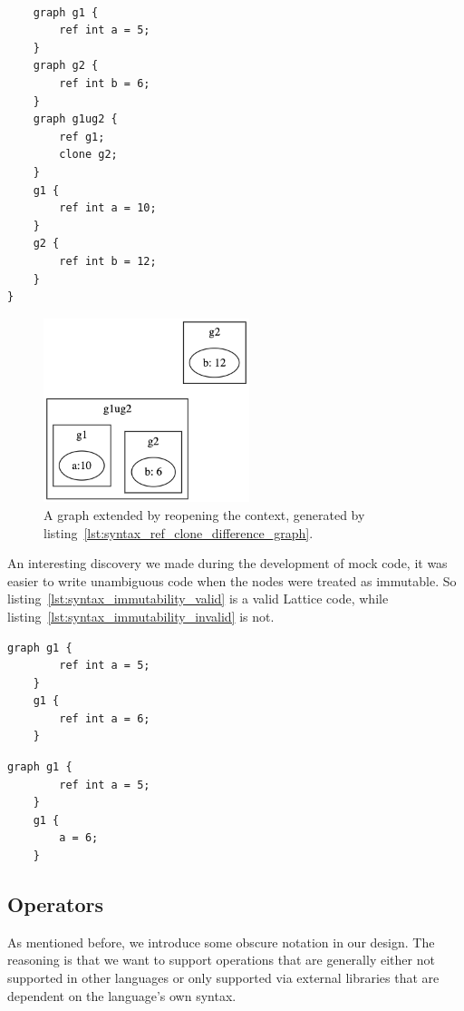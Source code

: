 \begin{lstlisting}[caption={Ref and clone with graphs.},captionpos=b, label={lst:syntax_ref_clone_difference_graph}]

    graph g1 {
        ref int a = 5;
    }
    graph g2 {
        ref int b = 6;
    }
    graph g1ug2 {
        ref g1;
        clone g2;
    }
    g1 {
        ref int a = 10;
    }
    g2 {
        ref int b = 12;
    }
}
\end{lstlisting}
\begin{figure}[H]
    \centering
    \includegraphics[width=6cm]{figures/syntax_section/syntax_ref_vs_clone_graphs}
    \caption{A graph extended by reopening the context, generated by listing~\ref{lst:syntax_ref_clone_difference_graph}.}
    \label{fig:syntax_ref_vs_clone_with_graphs}
\end{figure}

An interesting discovery we made during the development of mock code, it was easier to write unambiguous code
when the nodes were treated as immutable.
So listing~\ref{lst:syntax_immutability_valid} is a valid Lattice code, while listing~\ref{lst:syntax_immutability_invalid} is not.

\begin{lstlisting}[caption={Valid destruction and recreation of nodes.},captionpos=b,label={lst:syntax_immutability_valid}]
    graph g1 {
        ref int a = 5;
    }
    g1 {
        ref int a = 6;
    }
\end{lstlisting}

\begin{lstlisting}[caption={Code violating the immutability of nodes.},captionpos=b,label={lst:syntax_immutability_invalid}]
    graph g1 {
        ref int a = 5;
    }
    g1 {
        a = 6;
    }
\end{lstlisting}


\subsection{Operators}\label{subsec:syntax_operators}
As mentioned before, we introduce some obscure notation in our design.
The reasoning is that we want to support operations that are generally either not supported in other languages
or only supported via external libraries that are dependent on the language's own syntax.

